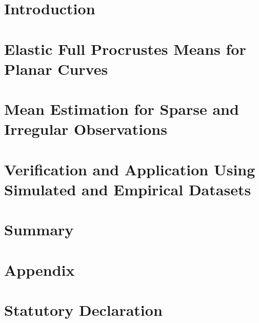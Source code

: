\documentclass[a4paper,12pt,english,headings=small,oneside]{scrreprt}
\theoremstyle{plain}
\theoremstyle{definition}
\theoremstyle{remark}
\theoremstyle{plain}
\begin{document}



\newpage
{}
\chapter{Introduction}


\newpage
\chapter{Elastic Full Procrustes Means for Planar Curves}


\newpage
\chapter{Mean Estimation for Sparse and Irregular Observations}


\newpage
\chapter{Verification and Application Using Simulated and Empirical Datasets}


\newpage
\chapter{Summary}




\newpage
\printbibliography[heading=bibintoc] %




\newpage
\appendix
\chapter{Appendix}


%

\newpage
\chapter*{Statutory Declaration}


%

\end{document}
